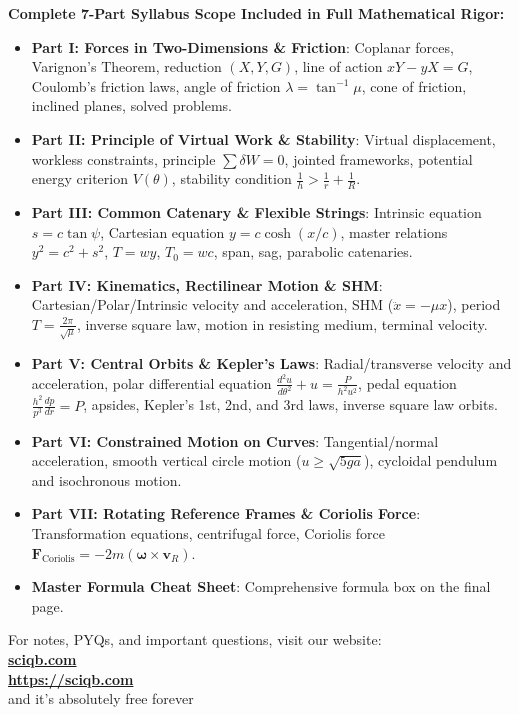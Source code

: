 \documentclass[11pt,a4paper]{article}
\begin{document}
\begin{titlepage}
    \begin{tcolorbox}[colback=accent!20,colframe=primary,arc=6pt,width=0.90\textwidth,halign=left]
    \textbf{\color{primary} Complete 7-Part Syllabus Scope Included in Full Mathematical Rigor:}
    \begin{itemize}[leftmargin=1.5em]
        \item \textbf{Part I: Forces in Two-Dimensions \& Friction}: Coplanar forces, Varignon's Theorem, reduction $(X, Y, G)$, line of action $xY - yX = G$, Coulomb's friction laws, angle of friction $\lambda = \tan^{-1}\mu$, cone of friction, inclined planes, solved problems.
        \item \textbf{Part II: Principle of Virtual Work \& Stability}: Virtual displacement, workless constraints, principle $\sum \delta W = 0$, jointed frameworks, potential energy criterion $V(\theta)$, stability condition $\frac{1}{h} > \frac{1}{r} + \frac{1}{R}$.
        \item \textbf{Part III: Common Catenary \& Flexible Strings}: Intrinsic equation $s = c \tan\psi$, Cartesian equation $y = c \cosh(x/c)$, master relations $y^2 = c^2+s^2$, $T = wy$, $T_0 = wc$, span, sag, parabolic catenaries.
        \item \textbf{Part IV: Kinematics, Rectilinear Motion \& SHM}: Cartesian/Polar/Intrinsic velocity and acceleration, SHM ($\ddot{x} = -\mu x$), period $T = \frac{2\pi}{\sqrt{\mu}}$, inverse square law, motion in resisting medium, terminal velocity.
        \item \textbf{Part V: Central Orbits \& Kepler's Laws}: Radial/transverse velocity and acceleration, polar differential equation $\frac{d^2u}{d\theta^2}+u = \frac{P}{h^2u^2}$, pedal equation $\frac{h^2}{p^3}\frac{dp}{dr} = P$, apsides, Kepler's 1st, 2nd, and 3rd laws, inverse square law orbits.
        \item \textbf{Part VI: Constrained Motion on Curves}: Tangential/normal acceleration, smooth vertical circle motion ($u \ge \sqrt{5ga}$), cycloidal pendulum and isochronous motion.
        \item \textbf{Part VII: Rotating Reference Frames \& Coriolis Force}: Transformation equations, centrifugal force, Coriolis force $\mathbf{F}_{\text{Coriolis}} = -2m (\boldsymbol{\omega} \times \mathbf{v}_R)$.
        \item \textbf{Master Formula Cheat Sheet}: Comprehensive formula box on the final page.
    \end{itemize}
    \end{tcolorbox}
    \vfill
    {\large\sffamily For notes, PYQs, and important questions, visit our website:}\\[0.3cm]
    {\Huge\bfseries\color{primary} \href{https://sciqb.com}{sciqb.com}}\\[0.2cm]
    {\large\bfseries\color{secondary} \url{https://sciqb.com}}\\[0.2cm]
    {\large\sffamily and it's absolutely free forever}\\
    \vspace*{0.5cm}
\end{titlepage}
\end{document}
